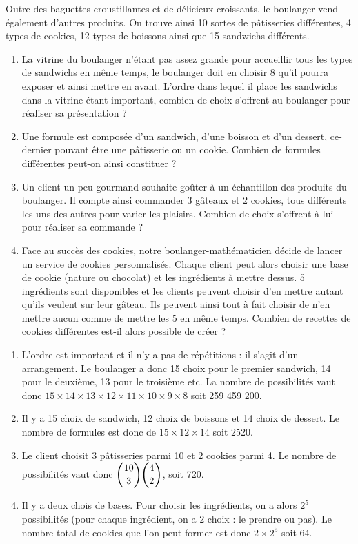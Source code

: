 \documentclass[11pt,fleqn, openany]{book} %
\begin{document}
\begin{exercise}[topic=comb04]Outre des baguettes croustillantes et de délicieux croissants, le boulanger vend également d'autres produits. On trouve ainsi 10 sortes de pâtisseries différentes, 4 types de cookies, 12 types de boissons ainsi que 15 sandwichs différents.

\begin{enumerate}
\item La vitrine du boulanger n'étant pas assez grande pour accueillir tous les types de sandwichs en même temps, le boulanger doit en choisir 8 qu'il pourra exposer et ainsi mettre en avant.  L'ordre dans lequel il place les sandwichs dans la vitrine étant important, combien de choix s'offrent au boulanger pour réaliser sa présentation ?
\item Une formule est composée d'un sandwich, d'une boisson et d'un dessert, ce-dernier pouvant être une pâtisserie ou un cookie. Combien de formules différentes peut-on ainsi constituer ?
\item Un client un peu gourmand souhaite goûter à un échantillon des produits du boulanger. Il compte ainsi commander 3 gâteaux et 2 cookies, tous différents les uns des autres pour varier les plaisirs. Combien de choix s'offrent à lui pour réaliser sa commande ?
\item Face au succès des cookies, notre boulanger-mathématicien décide de lancer un service de cookies personnalisés. Chaque client peut alors choisir une base de cookie (nature ou chocolat) et les ingrédients à mettre dessus. 5 ingrédients sont disponibles et les clients peuvent choisir d'en mettre autant qu'ils veulent sur leur gâteau. Ils peuvent ainsi tout à fait choisir de n'en mettre aucun comme de mettre les 5 en même temps. Combien de recettes de cookies différentes est-il alors possible de créer ?
\end{enumerate}\end{exercise}

\begin{solution}\begin{enumerate}
\item L'ordre est important et il n'y a pas de répétitions : il s'agit d'un arrangement. Le boulanger a donc 15 choix pour le premier sandwich, 14 pour le deuxième, 13 pour le troisième etc. La nombre de possibilités vaut donc $15 \times 14 \times 13 \times 12 \times 11 \times 10 \times 9 \times 8$ soit 259 459 200. 
\item Il y a 15 choix de sandwich, 12 choix de boissons et 14 choix de dessert. Le nombre de formules est donc de $15 \times 12 \times 14$ soit 2520.
\item Le client choisit 3 pâtisseries parmi 10 et 2 cookies parmi 4. Le nombre de possibilités vaut donc $\dbinom{10}{3} \dbinom{4}{2}$, soit 720.
\item Il y a deux chois de bases. Pour choisir les ingrédients, on a alors $2^5$ possibilités (pour chaque ingrédient, on a 2 choix : le prendre ou pas). Le nombre total de cookies que l'on peut former est donc $2  \times 2^5$ soit 64. 
\end{enumerate}
\end{solution}
\end{document}
